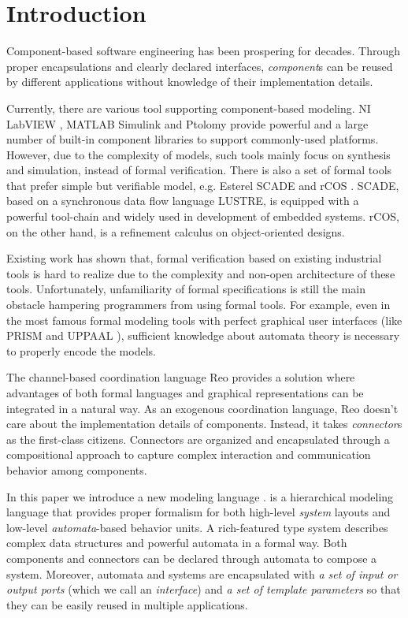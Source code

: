 \section{Introduction}
\label{sec:introduction}

Component-based software engineering has been prospering for decades. Through proper encapsulations and clearly declared interfaces, \emph{component}s can be reused by different applications without knowledge of their implementation details.

Currently, there are various tool supporting component-based modeling. NI LabVIEW \cite{labview}, MATLAB Simulink \cite{hahn2016essentialsimulink} and Ptolomy \cite{KimPtolomy2017} provide powerful  and a large number of built-in component libraries to support commonly-used platforms. However, due to the complexity of models, such tools mainly focus on synthesis and simulation, instead of formal verification.
There is also a set of formal tools that prefer simple but verifiable model, e.g. Esterel SCADE \cite{AbdullaISoLA2006} and rCOS \cite{LiuFsenRcos2010}. SCADE, based on a synchronous data flow language LUSTRE, is equipped with a powerful tool-chain and widely used in development of embedded systems. rCOS, on the other hand, is a refinement calculus on object-oriented designs.

Existing work \cite{ZouSimulinkHcsp2013} has shown that, formal verification based on existing industrial tools is hard to realize due to the complexity and non-open architecture of these tools. Unfortunately, unfamiliarity of formal specifications is still the main obstacle hampering programmers from using formal tools. For example, even in the most famous formal modeling tools with perfect graphical user interfaces (like PRISM \cite{KwiatkowskaCavPrism2011} and UPPAAL \cite{AmnellMovepUppaal2001}), sufficient knowledge about automata theory is necessary to properly encode the models.

The channel-based coordination language Reo \cite{ArbabMscsReo2004} provides a solution where advantages of both formal languages and graphical representations can be integrated in a natural way. As an exogenous coordination language, Reo doesn't care about the implementation details of components. Instead, it takes \emph{connector}s as the first-class citizens. Connectors are organized and encapsulated through a compositional approach to capture complex interaction and communication behavior among components.

In this paper we introduce a new modeling language \emlang{}. \lang{} is a hierarchical modeling language that provides proper formalism for both high-level \emph{system} layouts and low-level \emph{automata}-based behavior units. A rich-featured type system describes complex data structures and powerful automata in a formal way. Both components and connectors can be declared through automata to compose a system. Moreover, automata and systems are encapsulated with \emph{a set of input or output ports} (which we call an \emph{interface}) and \emph{a set of template parameters} so that they can be easily reused in multiple applications. 

